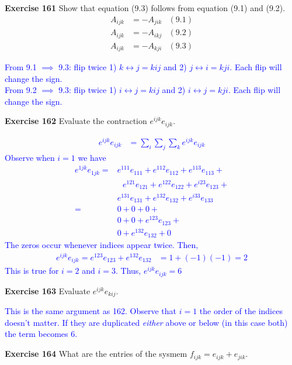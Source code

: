 \documentclass[12pt,a4paper]{report}
\newcommand{\BLUE}[1]{\textcolor{blue}{#1}}
\begin{document}
\begin{description}

\item \textbf{Exercise 161}  Show that equation (9.3) follows from equation (9.1) and (9.2).
\begin{align*}
	A_{ijk} &= -A_{jik} & (9.1) \\
	A_{ijk} &= -A_{ikj} & (9.2) \\
	A_{ijk} &= -A_{kji} & (9.3)
\end{align*}

\BLUE{From 9.1 $\implies$ 9.3: flip twice 1) $k \leftrightarrow j = kij$ and 2) $j \leftrightarrow i = kji$.  Each flip will change the sign. \\
From 9.2 $\implies$ 9.3:  flip twice 1) $i \leftrightarrow j = kij$ and 2) $i \leftrightarrow j = kji$.  Each flip will change the sign.
}

\item \textbf{Exercise 162} Evaluate the contraction $e^{ijk}e_{ijk}$.

\BLUE{\begin{align*}
	e^{ijk}e_{ijk} &= \sum_i\sum_j\sum_k e^{ijk}e_{ijk} 
\end{align*}Observe when $i=1$ we have 
\begin{align*}
	e^{1jk}e_{1jk} =& e^{111}e_{111}+e^{112}e_{112} + e^{113}e_{113} + \\
	&\text{ }e^{121}e_{121}+e^{122}e_{122} + e^{i23}e_{123} +\\
	& e^{131}e_{131}+e^{132}e_{132} + e^{i33}e_{133} \\
	=& 0+0 + 0 + \\
	& 0+0 + e^{123}e_{123} +\\
	& 0+e^{132}e_{132} + 0
\end{align*}The zeros occur whenever indices appear twice.  Then,
\begin{align*}
	e^{ijk}e_{ijk} = e^{123}e_{123} + e^{132}e_{132} &= 1 + (-1)(-1) = 2\end{align*}This is true for $i=2$ and $i=3$.  Thus, $e^{ijk}e_{ijk} = 6$
}
\item \textbf{Exercise 163}  Evaluate $e^{ijk}e_{kij}$.

\BLUE{This is the same argument as 162.  Observe that $i=1$ the order of the indices doesn't matter.  If they are duplicated \textit{either} above or below (in this case both) the term becomes 6.
}

\item \textbf{Exercise 164}  What are the entries of the sysmem $f_{ijk}=e_{ijk}+e_{jik}$.


\end{description}
\end{document}
